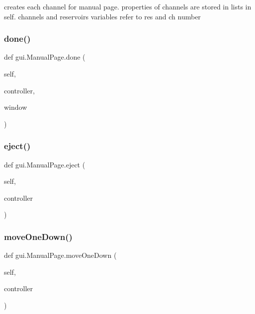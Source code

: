 \begin{DoxyVerb}creates each channel for manual page. properties of channels are stored in lists in self.
channels and reservoirs variables refer to res and ch number
\end{DoxyVerb}
 \mbox{\label{classgui_1_1_manual_page_ac5c61f69c0761507a9dc9a3c4d43f2f5}} 
\subsubsection{\texorpdfstring{done()}{done()}}
{\footnotesize\ttfamily def gui.\+Manual\+Page.\+done (\begin{DoxyParamCaption}\item[{}]{self,  }\item[{}]{controller,  }\item[{}]{window }\end{DoxyParamCaption})}

\mbox{\label{classgui_1_1_manual_page_a0de2157aaaeff0caef49e89b5e1bc469}} 
\subsubsection{\texorpdfstring{eject()}{eject()}}
{\footnotesize\ttfamily def gui.\+Manual\+Page.\+eject (\begin{DoxyParamCaption}\item[{}]{self,  }\item[{}]{controller }\end{DoxyParamCaption})}

\mbox{\label{classgui_1_1_manual_page_ab2fca02c98e8dd45885747eb8df839eb}} 
\subsubsection{\texorpdfstring{moveOneDown()}{moveOneDown()}}
{\footnotesize\ttfamily def gui.\+Manual\+Page.\+move\+One\+Down (\begin{DoxyParamCaption}\item[{}]{self,  }\item[{}]{controller }\end{DoxyParamCaption})}

